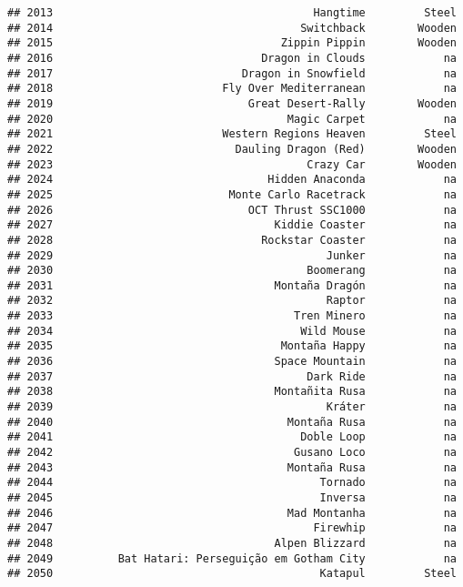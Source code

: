 \documentclass[
]{article}
\begin{document}
\begin{verbatim}
## 2013                                        Hangtime         Steel
## 2014                                      Switchback        Wooden
## 2015                                   Zippin Pippin        Wooden
## 2016                                Dragon in Clouds            na
## 2017                             Dragon in Snowfield            na
## 2018                          Fly Over Mediterranean            na
## 2019                              Great Desert-Rally        Wooden
## 2020                                    Magic Carpet            na
## 2021                          Western Regions Heaven         Steel
## 2022                            Dauling Dragon (Red)        Wooden
## 2023                                       Crazy Car        Wooden
## 2024                                 Hidden Anaconda            na
## 2025                           Monte Carlo Racetrack            na
## 2026                              OCT Thrust SSC1000            na
## 2027                                  Kiddie Coaster            na
## 2028                                Rockstar Coaster            na
## 2029                                          Junker            na
## 2030                                       Boomerang            na
## 2031                                  Montaña Dragón            na
## 2032                                          Raptor            na
## 2033                                     Tren Minero            na
## 2034                                      Wild Mouse            na
## 2035                                   Montaña Happy            na
## 2036                                  Space Mountain            na
## 2037                                       Dark Ride            na
## 2038                                  Montañita Rusa            na
## 2039                                          Kráter            na
## 2040                                    Montaña Rusa            na
## 2041                                      Doble Loop            na
## 2042                                     Gusano Loco            na
## 2043                                    Montaña Rusa            na
## 2044                                         Tornado            na
## 2045                                         Inversa            na
## 2046                                    Mad Montanha            na
## 2047                                        Firewhip            na
## 2048                                  Alpen Blizzard            na
## 2049          Bat Hatari: Perseguição em Gotham City            na
## 2050                                         Katapul         Steel

\end{verbatim}
\end{document}
